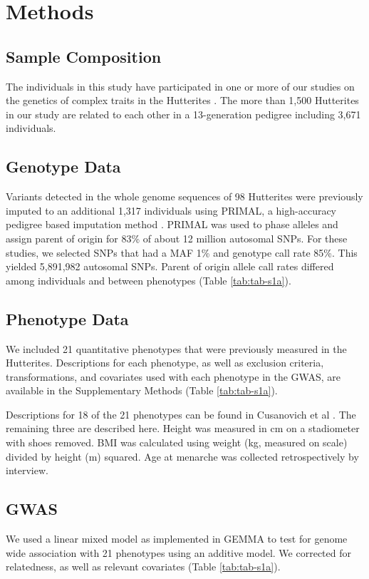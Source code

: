 \section{Methods}\label{ch02-methods}

\subsection{Sample Composition}\label{Sample Composition}
The individuals in this study have participated in one or more of our studies on the genetics of complex traits in the Hutterites \cite{Cusanovich:2016id,Weiss:2005cq,Abney2001}. The more than 1,500 Hutterites in our study are related to each other in a 13-generation pedigree including 3,671 individuals. 

\subsection{Genotype Data}\label{Genotype Data}
Variants detected in the whole genome sequences of 98 Hutterites were previously imputed to an additional 1,317 individuals using PRIMAL, a high-accuracy pedigree based imputation method \cite{Livne2015}. PRIMAL was used to phase alleles and assign parent of origin for 83\% of about 12 million autosomal SNPs. For these studies, we selected SNPs that had a MAF 1\% and genotype call rate 85\%. This yielded 5,891,982 autosomal SNPs. Parent of origin allele call rates differed among individuals and between phenotypes (Table \ref{tab:tab-s1a}).

\subsection{Phenotype Data}\label{Phenotype Data}
We included 21 quantitative phenotypes that were previously measured in the Hutterites. Descriptions for each phenotype, as well as exclusion criteria, transformations, and covariates used with each phenotype in the GWAS, are available in the Supplementary Methods (Table \ref{tab:tab-s1a}). 

Descriptions for 18 of the 21 phenotypes can be found in Cusanovich et al \cite{Cusanovich:2016id}. The remaining three are described here. Height was measured in cm on a stadiometer with shoes removed. BMI was calculated using weight (kg, measured on scale) divided by height (m) squared. Age at menarche was collected retrospectively by interview. 

\subsection{GWAS}\label{GWAS Methods}
We used a linear mixed model as implemented in GEMMA to test for genome wide association with 21 phenotypes using an additive model. We corrected for relatedness, as well as relevant covariates (Table \ref{tab:tab-s1a}).


